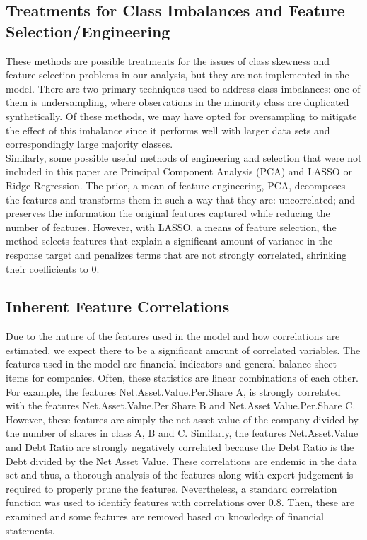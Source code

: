 \documentclass[12pt]{report}
\begin{document}
\subsection{Treatments for Class Imbalances and Feature Selection/Engineering}

These methods are possible treatments for the issues of class skewness and feature selection problems in our analysis, but they are not implemented in the model. There are two primary techniques used to address class imbalances: one of them is undersampling, where observations in the minority class are duplicated synthetically. Of these methods, we may have opted for oversampling to mitigate the effect of this imbalance since it performs well with larger data sets and correspondingly large majority classes. \\
\indent Similarly, some possible useful methods of engineering and selection that were not included in this paper are Principal Component Analysis (PCA) and LASSO or Ridge Regression. The prior, a mean of feature engineering, PCA, decomposes the features and transforms them in such a way that they are: uncorrelated; and preserves the information the original features captured while reducing the number of features. However, with LASSO, a means of feature selection, the method selects features that explain a significant amount of variance in the response target and penalizes terms that are not strongly correlated, shrinking their coefficients to 0.  \\

\subsection{Inherent Feature Correlations}

Due to the nature of the features used in the model and how correlations are estimated, we expect there to be a significant amount of correlated variables. The features used in the model are financial indicators and general balance sheet items for companies. Often, these statistics are linear combinations of each other. For example, the features Net.Asset.Value.Per.Share A, is strongly correlated with the features Net.Asset.Value.Per.Share B and Net.Asset.Value.Per.Share C. However, these features are simply the net asset value of the company divided by the number of shares in class A, B and C. Similarly, the features Net.Asset.Value and Debt Ratio are strongly negatively correlated because the Debt Ratio is the Debt divided by the Net Asset Value. These correlations are endemic in the data set and thus, a thorough analysis of the features along with expert judgement is required to properly prune the features. Nevertheless, a standard correlation function was used to identify features with correlations over 0.8. Then, these are examined and some features are removed based on knowledge of financial statements. \\ %
 \\%
\end{document}
